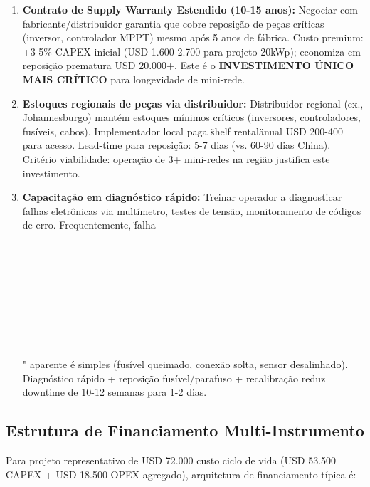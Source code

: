 \documentclass[12pt, a4paper]{article}
\begin{document}
\begin{enumerate}
\item
\textbf{Contrato de Supply Warranty Estendido (10-15 anos):} Negociar com fabricante/distribuidor garantia que cobre reposição de peças críticas (inversor, controlador MPPT) mesmo após 5 anos de fábrica. Custo premium: +3-5\% CAPEX inicial (USD 1.600-2.700 para projeto 20kWp); economiza em reposição prematura USD 20.000+. Este é o
\textbf{INVESTIMENTO ÚNICO MAIS CRÍTICO} para longevidade de mini-rede.\

\item\textbf{Estoques regionais de peças via distribuidor:} Distribuidor regional (ex., Johannesburgo) mantém estoques mínimos críticos (inversores, controladores, fusíveis, cabos). Implementador local paga \"shelf rental\" anual USD 200-400 para acesso. Lead-time para reposição: 5-7 dias (vs. 60-90 dias China). Critério viabilidade: operação de 3+ mini-redes na região justifica este investimento.\

\item\textbf{Capacitação em diagnóstico rápido:} Treinar operador a diagnosticar falhas eletrônicas via multímetro, testes de tensão, monitoramento de códigos de erro. Frequentemente, \"falha\\\\\\\\\\\\\\\\\\\\" aparente é simples (fusível queimado, conexão solta, sensor desalinhado). Diagnóstico rápido + reposição fusível/parafuso + recalibração reduz downtime de 10-12 semanas para 1-2 dias.\
\end{enumerate}

\subsection{Estrutura de Financiamento Multi-Instrumento}

Para projeto representativo de USD 72.000 custo ciclo de vida (USD 53.500 CAPEX + USD 18.500 OPEX agregado), arquitetura de financiamento típica é:\
\end{document}
